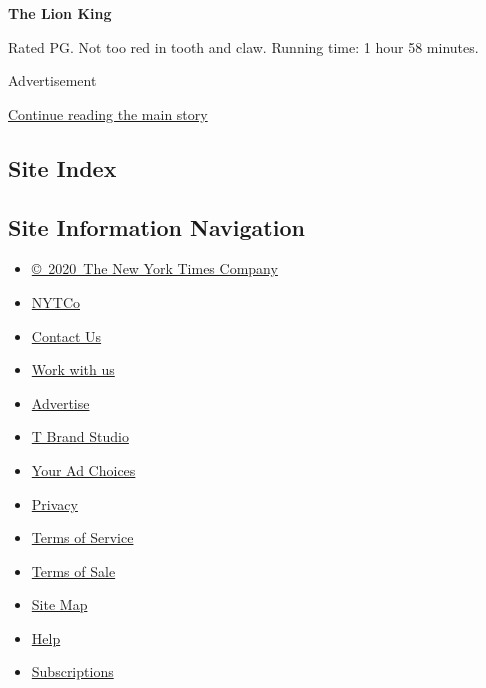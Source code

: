 \textbf{The Lion King}

Rated PG. Not too red in tooth and claw. Running time: 1 hour 58
minutes.

Advertisement

\protect\hyperlink{after-bottom}{Continue reading the main story}

\hypertarget{site-index}{%
\subsection{Site Index}\label{site-index}}

\hypertarget{site-information-navigation}{%
\subsection{Site Information
Navigation}\label{site-information-navigation}}

\begin{itemize}
\tightlist
\item
  \href{https://help.nytimes.com/hc/en-us/articles/115014792127-Copyright-notice}{©~2020~The
  New York Times Company}
\end{itemize}

\begin{itemize}
\tightlist
\item
  \href{https://www.nytco.com/}{NYTCo}
\item
  \href{https://help.nytimes.com/hc/en-us/articles/115015385887-Contact-Us}{Contact
  Us}
\item
  \href{https://www.nytco.com/careers/}{Work with us}
\item
  \href{https://nytmediakit.com/}{Advertise}
\item
  \href{http://www.tbrandstudio.com/}{T Brand Studio}
\item
  \href{https://www.nytimes.com/privacy/cookie-policy\#how-do-i-manage-trackers}{Your
  Ad Choices}
\item
  \href{https://www.nytimes.com/privacy}{Privacy}
\item
  \href{https://help.nytimes.com/hc/en-us/articles/115014893428-Terms-of-service}{Terms
  of Service}
\item
  \href{https://help.nytimes.com/hc/en-us/articles/115014893968-Terms-of-sale}{Terms
  of Sale}
\item
  \href{https://spiderbites.nytimes.com}{Site Map}
\item
  \href{https://help.nytimes.com/hc/en-us}{Help}
\item
  \href{https://www.nytimes.com/subscription?campaignId=37WXW}{Subscriptions}
\end{itemize}
